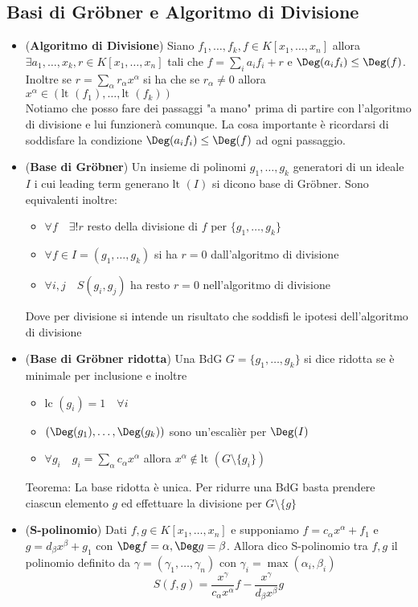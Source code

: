 \documentclass[a4paper,NoNotes,GeneralMath]{stdmdoc}
\newcommand{\Lt}{\text{lt }}
\newcommand{\Lc}{\text{lc }}
\begin{document}
	\subsection*{Basi di Gröbner e Algoritmo di Divisione}
	\begin{itemize}
		\item ({\bf Algoritmo di Divisione}) Siano $f_1, \ldots, f_k, f \in K[x_1, \ldots, x_n]$ allora $\exists a_1, \ldots, x_k, r \in K[x_1, \ldots, x_n]$ tali che $f = \sum_i a_i f_i + r$ e $\Deg (a_i f_i) \le \Deg(f)$. Inoltre se $r = \sum_\alpha r_\alpha x^\alpha$ si ha che se $r_\alpha \neq 0$ allora $x^\alpha \in (\Lt(f_1), \ldots, \Lt(f_k))$ \\
		Notiamo che posso fare dei passaggi "a mano" prima di partire con l'algoritmo di divisione e lui funzionerà comunque. La cosa importante è ricordarsi di soddisfare la condizione $\Deg (a_i f_i) \le \Deg(f)$ ad ogni passaggio.
		\item ({\bf Base di Gröbner}) Un insieme di polinomi $g_1, \ldots, g_k$ generatori di un ideale $I$ i cui leading term generano $\Lt(I)$ si dicono base di Gröbner. Sono equivalenti inoltre:
			\begin{itemize}
				\item $\forall f \quad \exists ! r$ resto della divisione di $f$ per $\{g_1, \ldots, g_k\}$
				\item $\forall f \in I = (g_1, \ldots, g_k)$ si ha $r = 0$ dall'algoritmo di divisione
				\item $\forall i,j \quad S(g_i, g_j)$ ha resto $r = 0$ nell'algoritmo di divisione
			\end{itemize}
		Dove per divisione si intende un risultato che soddisfi le ipotesi dell'algoritmo di divisione
		\item ({\bf Base di Gröbner ridotta}) Una BdG $G = \{ g_1, \ldots, g_k \}$ si dice ridotta se è minimale per inclusione e inoltre
			\begin{itemize}
				\item $\Lc(g_i) = 1 \quad \forall i$
				\item $(\Deg(g_1), \ldots, \Deg(g_k))$ sono un'escalièr per $\Deg(I)$
				\item $\forall g_i \quad g_i = \sum_\alpha c_\alpha x^\alpha$ allora $x^\alpha \notin \Lt(G \setminus \{g_i\})$
			\end{itemize}
		Teorema: La base ridotta è unica. Per ridurre una BdG basta prendere ciascun elemento $g$ ed effettuare la divisione per $G \setminus \{g\}$
		\item ({\bf S-polinomio}) Dati $f, g \in K[x_1, \ldots, x_n]$ e supponiamo $f = c_\alpha x^\alpha + f_1$ e $g = d_\beta x^\beta + g_1$ con $\Deg f = \alpha, \Deg g = \beta$. Allora dico S-polinomio tra $f, g$ il polinomio definito da $\gamma = (\gamma_1, \ldots, \gamma_n)$ con $\gamma_i = \max(\alpha_i, \beta_i)$
			$$ S(f, g) = \frac{x^\gamma}{c_\alpha x^\alpha} f - \frac{x^\gamma}{d_\beta x^\beta} g $$
	\end{itemize}
	
\end{document}
